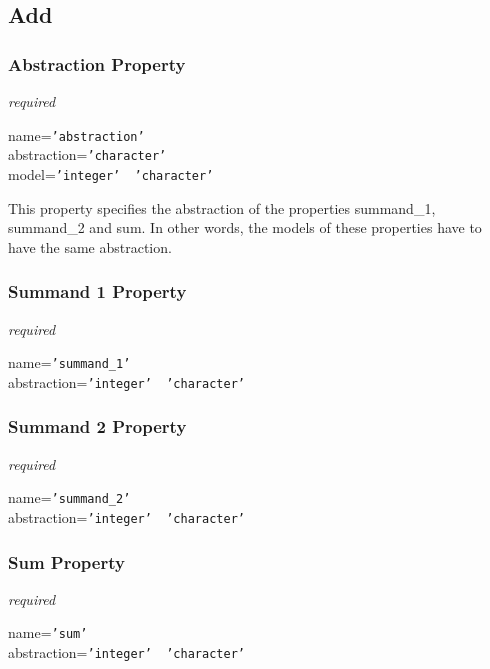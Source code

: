 %
%
%
%
%
%

\subsection{Add}
\label{add_heading}

\subsubsection{Abstraction Property}

\emph{required}

name=\texttt{'abstraction'}\\
abstraction=\texttt{'character'}\\
model=\texttt{'integer' \vline\ 'character'}

This property specifies the abstraction of the properties summand\_1,
summand\_2 and sum. In other words, the models of these properties have to have
the same abstraction.

\subsubsection{Summand 1 Property}

\emph{required}

name=\texttt{'summand\_1'}\\
abstraction=\texttt{'integer' \vline\ 'character'}\\

\subsubsection{Summand 2 Property}

\emph{required}

name=\texttt{'summand\_2'}\\
abstraction=\texttt{'integer' \vline\ 'character'}\\

\subsubsection{Sum Property}

\emph{required}

name=\texttt{'sum'}\\
abstraction=\texttt{'integer' \vline\ 'character'}\\
